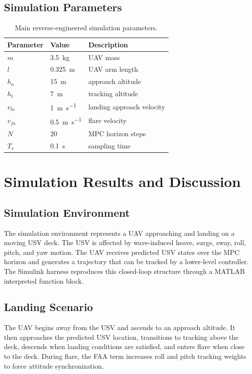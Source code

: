 \documentclass[12pt,a4paper]{report}
\begin{document}
\section{Simulation Parameters}
\begin{table}[H]
\centering
\caption{Main reverse-engineered simulation parameters.}
\begin{tabular}{lll}
\toprule
Parameter & Value & Description\\
\midrule
$m$ & \SI{3.5}{kg} & UAV mass\\
$l$ & \SI{0.325}{m} & UAV arm length\\
$h_a$ & \SI{15}{m} & approach altitude\\
$h_t$ & \SI{7}{m} & tracking altitude\\
$v_{la}$ & \SI{1}{m.s^{-1}} & landing approach velocity\\
$v_{fa}$ & \SI{0.5}{m.s^{-1}} & flare velocity\\
$N$ & 20 & MPC horizon steps\\
$T_s$ & \SI{0.1}{s} & sampling time\\
\bottomrule
\end{tabular}
\end{table}

\chapter{Simulation Results and Discussion}

\section{Simulation Environment}
The simulation environment represents a UAV approaching and landing on a moving USV deck. The USV is affected by wave-induced heave, surge, sway, roll, pitch, and yaw motion. The UAV receives predicted USV states over the MPC horizon and generates a trajectory that can be tracked by a lower-level controller. The Simulink harness reproduces this closed-loop structure through a MATLAB interpreted function block.

\section{Landing Scenario}
The UAV begins away from the USV and ascends to an approach altitude. It then approaches the predicted USV location, transitions to tracking above the deck, descends when landing conditions are satisfied, and enters flare when close to the deck. During flare, the FAA term increases roll and pitch tracking weights to force attitude synchronization.
\end{document}
